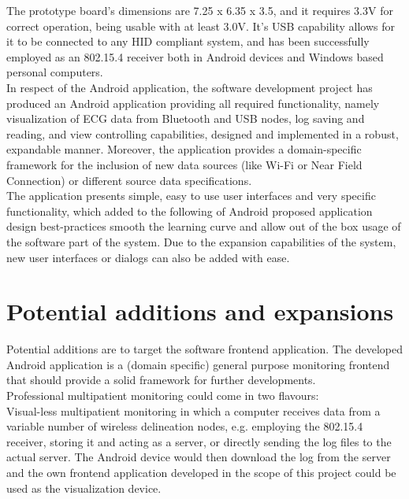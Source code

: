 		The prototype board's dimensions are 7.25 x 6.35 x 3.5, and it requires 3.3V for correct operation, being usable with at least 3.0V. It's USB capability allows for it to be connected to any HID compliant system, and has been successfully employed as an 802.15.4 receiver both in Android devices and Windows based personal computers.\\

		In respect of the Android application, the software development project has produced an Android application providing all required functionality, namely visualization of ECG data from Bluetooth and USB nodes, log saving and reading, and view controlling capabilities, designed and implemented in a robust, expandable manner. Moreover, the application provides a domain-specific framework for the inclusion of new data sources (like Wi-Fi or Near Field Connection) or different source data specifications.\\

		The application presents simple, easy to use user interfaces and very specific functionality, which added to the following of Android proposed application design best-practices smooth the learning curve and allow out of the box usage of the software part of the system. Due to the expansion capabilities of the system, new user interfaces or dialogs can also be added with ease.\\
	
	\section{Potential additions and expansions}
	\label{sec:end-further}

		Potential additions are to target the software frontend application. The developed Android application is a (domain specific) general purpose monitoring frontend that should provide a solid framework for further developments.\\

		Professional multipatient monitoring could come in two flavours:\\

		Visual-less multipatient monitoring in which a computer receives data from a variable number of wireless delineation nodes, e.g. employing the 802.15.4 receiver, storing it and acting as a server, or directly sending the log files to the actual server. The Android device would then download the log from the server and the own frontend application developed in the scope of this project could be used as the visualization device.\\

